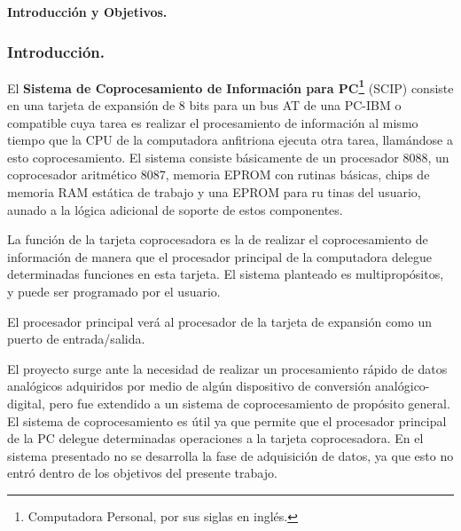 \vspace*{20pt}
\begin{flushleft}
{\LARGE\bf Introducci\'on y Objetivos.}
\end{flushleft}
\vskip 50pt
\label{Chapter:introbj}


\subsubsection{Introducci\'on.}
\label{Subsubsection:intro}

El {\bf Sistema de Coprocesamiento de Informaci\'on para %
PC\footnote{Computadora Personal, por sus siglas en %
ingl\'es.}} (SCIP) consiste en una tarjeta de expansi\'on de %
8 bits para un bus AT de una PC-IBM o compatible cuya tarea %
es realizar el procesamiento de informaci\'on al mismo tiempo %
que la CPU de la computadora anfitriona ejecuta otra tarea, %
llam\'andose a esto coprocesamiento. El sistema consiste %
b\'a\-si\-ca\-men\-te de un  procesador 8088, un %
coprocesador a\-rit\-m\'e\-ti\-co 8087, me\-mo\-ria EPROM %
con ru\-ti\-nas b\'a\-si\-cas, chips de me\-mo\-ria RAM %
es\-t\'a\-ti\-ca de tra\-ba\-jo y una EPROM pa\-ra ru\-%
ti\-nas del u\-sua\-rio, aunado a la l\'ogica adicional de %
soporte de estos componentes.

La funci\'on de la tarjeta coprocesadora es la de realizar el %
coprocesamiento
de informaci\'on de manera que el procesador principal de la %
computadora delegue determinadas funciones en esta tarjeta. %
El sistema planteado es multiprop\'ositos, y puede ser %
programado por el usuario.

El procesador principal ver\'a al procesador de la tarjeta de %
expansi\'on como un puerto de entrada/salida.

El proyecto surge ante la necesidad de realizar un %
procesamiento r\'apido de 
datos anal\'ogicos adquiridos por medio de alg\'un %
dispositivo de conversi\'on anal\'ogico-digital, pero fue %
extendido a un sistema de coprocesamiento de prop\'osito %
general. El sistema de coprocesamiento es \'util ya que %
permite que el procesador principal de la PC delegue %
determinadas operaciones a la tarjeta coprocesadora. En el %
sistema presentado no se desarrolla la fase de adquisici\'on %
de datos, ya que esto no entr\'o dentro de los objetivos del %
presente trabajo.


